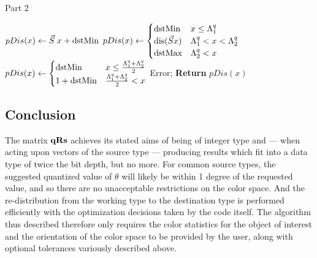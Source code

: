 \addtocounter{algorithm}{-1}
\begin{algorithm}[h]
\caption{Part 2}
\begin{algorithmic}[1]
          \State   
          $  pDis(x) \gets \Scale \; x + \dstMin $
         \State  
         $ pDis(x) \gets \begin{cases}
          \dstMin & x \le \Discard_1^q \\
          \text{dis}(\Scale x) & \Discard_1^q < x < \Discard_2^q \\
          \dstMax & \Discard_2^q < x  \\
          \end{cases} $
         \State   
         $  pDis(x) \gets \begin{cases}
           \text{dstMin} & x \le \frac{\Lambda_1^q + \Lambda_2^q}{2} \\
           1 + \text{dstMin}  &  \frac{\Lambda_1^q + \Lambda_2^q}{2} < x\\
           \end{cases} $
            \Else {}
            \State Error; 
            \EndIf
            \State \textbf{Return} {$pDis(x)$}
\end{algorithmic}
\end{algorithm}

\subsection{Conclusion}
The matrix $\qRs$ achieves its stated aims of being of integer type and --- when acting upon vectors of the source type --- producing results which fit into a data type of twice the bit depth, but no more. For common source types, the suggested quantized value of $\theta$ will likely be within 1 degree of the requested value, and so there are no unacceptable restrictions on the color space. And the re-distribution from the working type to the destination type is performed efficiently with the optimization decisions taken by the code itself. The algorithm thus described therefore only requires the color statistics for the object of interest and the orientation of the color space to be provided by the user, along with optional tolerances variously described above.

